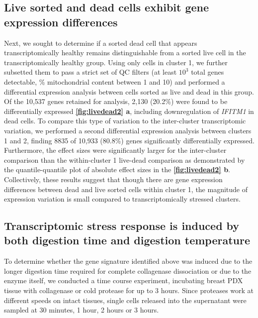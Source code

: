 \subsection{Live sorted and dead cells exhibit gene expression differences}
Next, we sought to determine if a sorted dead cell that appears transcriptomically healthy remains distinguishable from a sorted live cell in the transcriptomically healthy group. Using only cells in cluster 1, we further subsetted them to pass a strict set of QC filters (at least $10^3$ total genes detectable, \% mitochondrial content between 1 and 10) and performed a differential expression analysis between cells sorted as live and dead in this group. Of the 10,537 genes retained for analysis, 2,130 (20.2\%) were found to be differentially expressed \textbf{\autoref{fig:livedead2} a}, including downregulation of \textit{IFITM1} in dead cells. To compare this type of variation to the inter-cluster transcriptomic variation, we performed a second differential expression analysis between clusters 1 and 2, finding 8835 of 10,933 (80.8\%) genes significantly differentially expressed. Furthermore, the effect sizes were significantly larger for the inter-cluster comparison than the within-cluster 1 live-dead comparison as demonstrated by the quantile-quantile plot of absolute effect sizes in the \textbf{\autoref{fig:livedead2} b}. Collectively, these results suggest that though there are gene expression differences between dead and live sorted cells within cluster 1, the magnitude of expression variation is small compared to transcriptomically stressed clusters.
 
\subsection{Transcriptomic stress response is induced by both digestion time and digestion temperature}
To determine whether the gene signature identified above was induced due to the longer digestion time required for complete collagenase dissociation or due to the enzyme itself, we conducted a time course experiment, incubating breast PDX tissue with collagenase or cold protease for up to 3 hours. Since proteases work at different speeds on intact tissues, single cells released into the supernatant were sampled at 30 minutes, 1 hour, 2 hours or 3 hours.   


